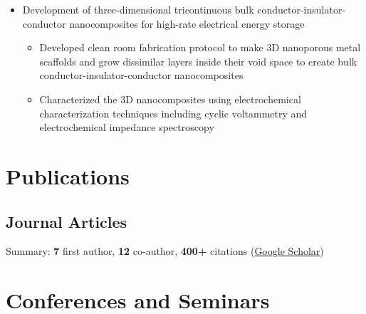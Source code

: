 \documentclass[11pt]{article} %
\begin{document}
\begin{itemize}
  \item Development of three-dimensional tricontinuous bulk conductor-insulator-conductor nanocomposites for high-rate electrical energy storage
    \begin{itemize}
      \item Developed clean room fabrication protocol to make 3D nanoporous metal scaffolds and grow dissimilar layers inside their void space to create bulk conductor-insulator-conductor nanocomposites
      \item Characterized the 3D nanocomposites using electrochemical characterization techniques including cyclic voltammetry and electrochemical impedance spectroscopy
    \end{itemize}
\end{itemize}

\section*{Publications}
\begin{refsection}
  \nocite{*}
  \printbibliography[heading=none, type=misc]
\end{refsection}

\subsection{Journal Articles}
Summary: \textbf{7} first author, \textbf{12} co-author, \textbf{400+} citations (\href{https://scholar.google.com/citations?user=WsQfglgAAAAJ&hl=en&authuser=1}{Google Scholar})

\begin{refsection}
  \nocite{*}
  \printbibliography[heading=none, type=article]
\end{refsection}

\section{Conferences and Seminars}
\setlength{\arrayrulewidth}{1mm} %
\renewcommand{\arraystretch}{1.3} %
\end{document}
